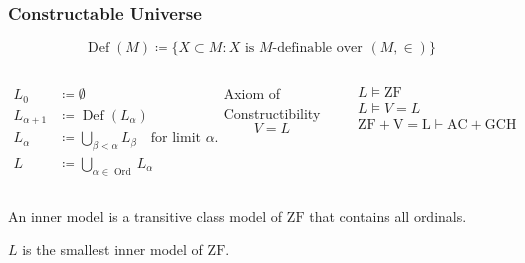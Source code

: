 \documentclass[UTF8,11pt,colorlinks,compress,openany]{beamer}%
\begin{document}
\begin{frame}\frametitle{Constructable Universe}
\setlength\abovedisplayskip{0pt}
\setlength\belowdisplayskip{0pt}
\[\operatorname{Def}(M)\coloneqq \big\{X\subset M: X \mbox{ is $M$-definable over } (M,\in)\big\}\]
\begin{columns}
\begin{definition}
\begin{align*}
L_0&\coloneqq \emptyset\\
L_{\alpha+1}&\coloneqq \operatorname{Def}(L_\alpha)\\
L_\alpha&\coloneqq \bigcup\limits_{\beta<\alpha}L_\beta \quad\mbox{for limit } \alpha.\\
L&\coloneqq \bigcup\limits_{\alpha\in\operatorname{Ord}}L_\alpha
\end{align*}
\end{definition}
\begin{block}{Axiom of Constructibility}
\[V=L\]
\end{block}
\begin{align*}
&L\vDash\mathrm{ZF}\\
&L\vDash V=L\\
&\mathrm{ZF+V=L}\vdash\mathrm{AC+GCH}
\end{align*}
\end{columns}
An inner model is a transitive class model of $\mathrm{ZF}$ that contains all ordinals.

$L$ is the smallest inner model of $\mathrm{ZF}$.
\end{frame}
\end{document}
